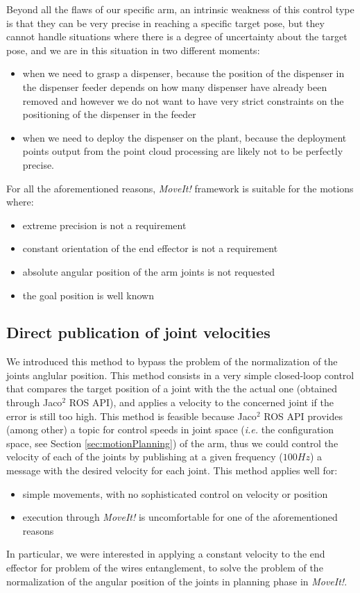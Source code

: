 Beyond all the flaws of our specific arm, an intrinsic weakness of this control type is that they can be very precise in reaching a specific target pose, but they cannot handle situations where there is a degree of uncertainty about the target pose, and we are in this situation in two different moments:
\begin{itemize}
	\item when we need to grasp a dispenser, because the position of the dispenser in the dispenser feeder depends on how many dispenser have already been removed and however we do not want to have very strict constraints on the positioning of the dispenser in the feeder
	\item when we need to deploy the dispenser on the plant, because the deployment points output from the point cloud processing are likely not to be perfectly precise.
\end{itemize}
For all the aforementioned reasons, \textit{MoveIt!} framework is suitable for the motions where:
\begin{itemize}
	\item extreme precision is not a requirement
	\item constant orientation of the end effector is not a requirement
	\item absolute angular position of the arm joints is not requested
	\item the goal position is well known
\end{itemize}

\subsection{Direct publication of joint velocities}
We introduced this method to bypass the problem of the normalization of the joints anglular position. This method consists in a very simple closed-loop control that compares the target position of a joint with the the actual one (obtained through Jaco$^2$ \ac{ROS} \ac{API}), and applies a velocity to the concerned joint if the error is still too high. This method is feasible because Jaco$^2$ \ac{ROS} \ac{API} provides (among other) a topic for control speeds in joint space (\textit{i.e.} the configuration space, see Section \ref{sec:motionPlanning}) of the arm, thus we could control the velocity of each of the joints by publishing at a given frequency ($100Hz$) a message with the desired velocity for each joint. This method applies well for:
\begin{itemize}
	\item simple movements, with no sophisticated control on velocity or position
	\item execution through \textit{MoveIt!} is uncomfortable for one of the aforementioned reasons
\end{itemize}
In particular, we were interested in applying a constant velocity to the end effector for problem of the wires entanglement, to solve the problem of the normalization of the angular position of the joints in planning phase in \textit{MoveIt!}.

